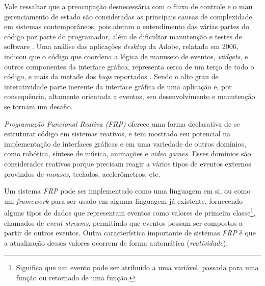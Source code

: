 Vale ressaltar que a preocupação desnecessária com o
fluxo de controle e o mau gerenciamento de estado são
consideradas as principais causas de complexidade em
sistemas contemporâneos, pois afetam o entendimento das
várias partes do código por parte do programador,
além de dificultar manutenção e testes de software
\cite{moseley06out}.
Uma análise das aplicações \emph{desktop} da Adobe,
relatada em 2006, indicou que o código que coordena a
lógica de manuseio de eventos, \emph{widgets}, e outros
componentes da interface gráfica, representa cerca de
um terço de todo o código, e mais da metade dos \emph{bugs}
reportados \cite{jarvi2008property}.
Sendo o alto grau de interatividade parte inerente da
interface gráfica de uma aplicação e, por consequência,
altamente orientada a eventos, seu desenvolvimento e
manutenção se tornam um desafio.


%

\emph{Programação Funcional Reativa (FRP)} oferece uma forma
declarativa de se estruturar código em sistemas reativos,
e tem mostrado seu potencial na implementação de
interfaces gráficas e em uma variedade de outros domínios,
como robótica, síntese de música, animações e
\emph{video games}. Esses domínios são considerados
reativos porque precisam reagir a vários tipos de
eventos externos provindos de \emph{mouses}, teclados,
acelerômetros, etc.

Um sistema \emph{FRP} pode ser implementado como uma
linguagem em si, ou como um \emph{framework} para ser
usado em alguma linguagem já existente, fornecendo alguns
tipos de dados que representam eventos como valores de
primeira classe\footnote{
  Significa que um evento pode ser atribuído a uma
  variável, passada para uma função ou retornado de
  uma função.
},
chamados de \emph{event streams}, permitindo que eventos
possam ser compostos a partir de outros eventos.
Outra característica importante de sistemas \emph{FRP}
é que a atualização desses valores ocorrem de forma
automática (\emph{reatividade}).

